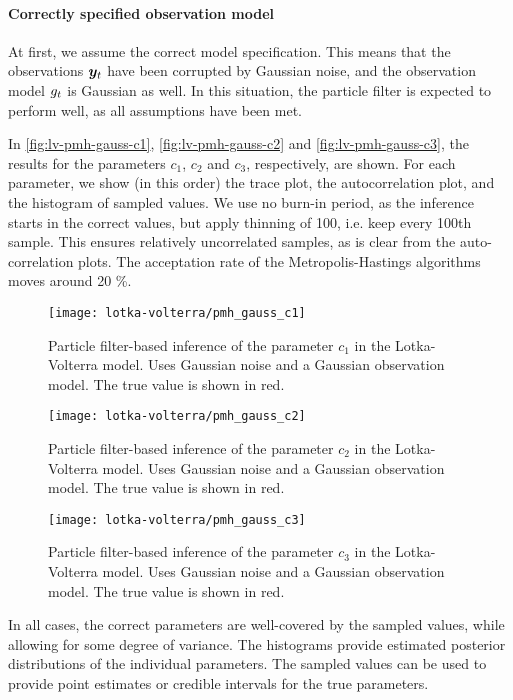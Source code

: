 \paragraph{Correctly specified observation model}
At first, we assume the correct model specification. This means that the observations $\bm{y}_t$ have been corrupted by Gaussian noise, and the observation model $g_t$ is Gaussian as well. In this situation, the particle filter is expected to perform well, as all assumptions have been met.

In \autoref{fig:lv-pmh-gauss-c1}, \autoref{fig:lv-pmh-gauss-c2} and \autoref{fig:lv-pmh-gauss-c3}, the results for the parameters $c_1$, $c_2$ and $c_3$, respectively, are shown. For each parameter, we show (in this order) the trace plot, the autocorrelation plot, and the histogram of sampled values. We use no burn-in period, as the inference starts in the correct values, but apply thinning of 100, i.e. keep every 100th sample. This ensures relatively uncorrelated samples, as is clear from the auto-correlation plots. The acceptation rate of the Metropolis-Hastings algorithms moves around 20 \%.

\begin{figure}[htp]
    \centering
    \texttt{[image: lotka-volterra/pmh\_gauss\_c1]}
    \caption{Particle filter-based inference of the parameter $c_1$ in the Lotka-Volterra model. Uses Gaussian noise and a Gaussian observation model. The true value is shown in red.}
    \label{fig:lv-pmh-gauss-c1}
\end{figure}

\begin{figure}[htp]
    \centering
    \texttt{[image: lotka-volterra/pmh\_gauss\_c2]}
    \caption{Particle filter-based inference of the parameter $c_2$ in the Lotka-Volterra model. Uses Gaussian noise and a Gaussian observation model. The true value is shown in red.}
    \label{fig:lv-pmh-gauss-c2}
\end{figure}

\begin{figure}[htp]
    \centering
    \texttt{[image: lotka-volterra/pmh\_gauss\_c3]}
    \caption{Particle filter-based inference of the parameter $c_3$ in the Lotka-Volterra model. Uses Gaussian noise and a Gaussian observation model. The true value is shown in red.}
    \label{fig:lv-pmh-gauss-c3}
\end{figure}

In all cases, the correct parameters are well-covered by the sampled values, while allowing for some degree of variance. The histograms provide estimated posterior distributions of the individual parameters. The sampled values can be used to provide point estimates or credible intervals for the true parameters.

